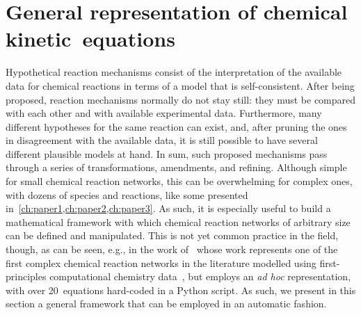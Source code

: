\section{General representation of chemical kinetic~equations}%
\label{sec:kin-repr}

Hypothetical reaction mechanisms consist of the interpretation of the available data for chemical reactions in terms of a model that is self-consistent.
After being proposed,
reaction mechanisms normally do not stay still: they must be compared with each other and with available experimental data.
Furthermore,
many different hypotheses for the same reaction can exist,
and,
after pruning the ones in disagreement with the available data,
it is still possible to have several different plausible models at hand.
In sum,
such proposed mechanisms pass through a series of transformations,
amendments,
and refining.
Although simple for small chemical reaction networks,
this can be overwhelming for complex ones,
with dozens of species and reactions,
like some presented in~\cref{ch:paper1,ch:paper2,ch:paper3}.
As such,
it is especially useful to build a mathematical framework with which chemical reaction networks of arbitrary size can be defined and manipulated.
This is not yet common practice in the field,
though,
as can be seen,
e.g.,
in the work of~\citeauthor{P_rez_Soto_2020} whose work represents one of the first complex chemical reaction networks in the literature modelled using first-principles computational chemistry data~\cite{P_rez_Soto_2020},
but employs an \emph{ad hoc} representation,
with over 20~equations hard-coded in a Python script.
As such,
we present in this section a general framework that can be employed in an automatic fashion.

